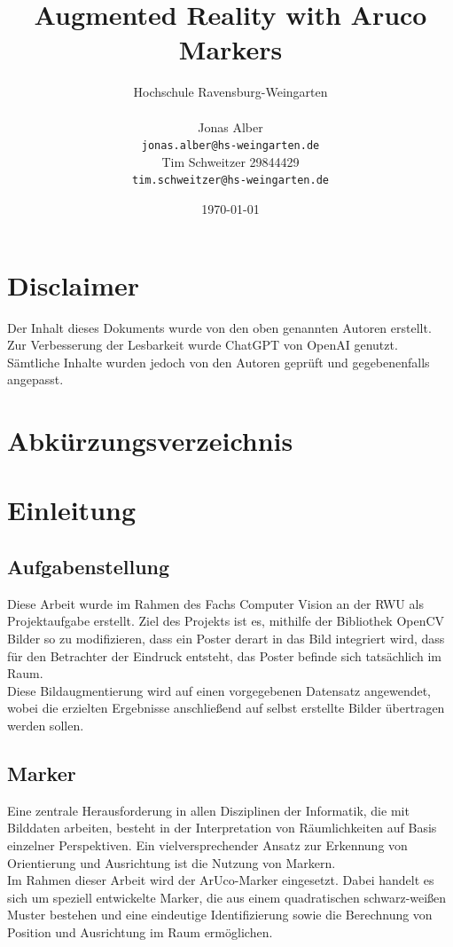 \documentclass[a4paper,twocolumn]{article}
\title{Augmented Reality with Aruco Markers}
\author{
    Hochschule Ravensburg-Weingarten \\[1em] %
    \begin{minipage}[t]{0.45\textwidth} %
        \centering
        Jonas Alber \\ %
        \texttt{jonas.alber@hs-weingarten.de} %
    \end{minipage}
    \hfill
    \begin{minipage}[t]{0.45\textwidth} %
        \centering
        Tim Schweitzer 29844429 \\ %
        \texttt{tim.schweitzer@hs-weingarten.de} %
    \end{minipage}
}
\date{\today}
\begin{document}
\maketitle

\section*{Disclaimer}

Der Inhalt dieses Dokuments wurde von den oben genannten Autoren erstellt. Zur Verbesserung der Lesbarkeit wurde ChatGPT von OpenAI genutzt. Sämtliche Inhalte wurden jedoch von den Autoren geprüft und gegebenenfalls angepasst.


\section*{Abkürzungsverzeichnis}
\begin{acronym}[RWU]
\end{acronym}

\begin{abstract}

\end{abstract}

\section{Einleitung}

\subsection{Aufgabenstellung}
Diese Arbeit wurde im Rahmen des Fachs Computer Vision an der \ac{RWU} als Projektaufgabe erstellt. Ziel des Projekts ist es, mithilfe der Bibliothek OpenCV Bilder so zu modifizieren, dass ein Poster derart in das Bild integriert wird, dass für den Betrachter der Eindruck entsteht, das Poster befinde sich tatsächlich im Raum.
\\
Diese Bildaugmentierung wird auf einen vorgegebenen Datensatz angewendet, wobei die erzielten Ergebnisse anschließend auf selbst erstellte Bilder übertragen werden sollen.

\subsection{Marker}
Eine zentrale Herausforderung in allen Disziplinen der Informatik, die mit Bilddaten arbeiten, besteht in der Interpretation von Räumlichkeiten auf Basis einzelner Perspektiven. Ein vielversprechender Ansatz zur Erkennung von Orientierung und Ausrichtung ist die Nutzung von Markern.
\\
Im Rahmen dieser Arbeit wird der ArUco-Marker eingesetzt. Dabei handelt es sich um speziell entwickelte Marker, die aus einem quadratischen schwarz-weißen Muster bestehen und eine eindeutige Identifizierung sowie die Berechnung von Position und Ausrichtung im Raum ermöglichen.
\end{document}
